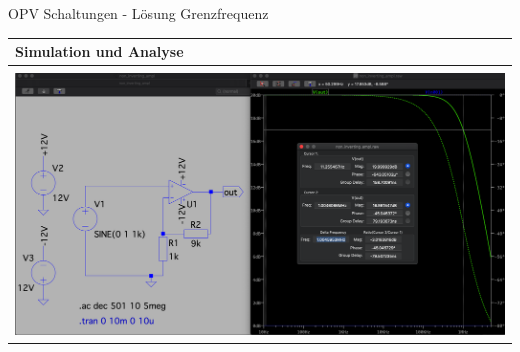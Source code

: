 \begin{frame}[t]{OPV Schaltungen - Lösung Grenzfrequenz}

  \begin{spacing}{0.9} \begin{tiny}
      \begin{table}[h!]
        \begin{tabular}{p{10cm}}
          \hline
          \textbf{Simulation und Analyse} \\
          \hline                          \\
          \begin{minipage}{\textwidth}
            \includegraphics[width=\linewidth]{pictures/bode_2.png}
          \end{minipage}
          \\
        \end{tabular}

      \end{table}

    \end{tiny} \end{spacing}

\end{frame}